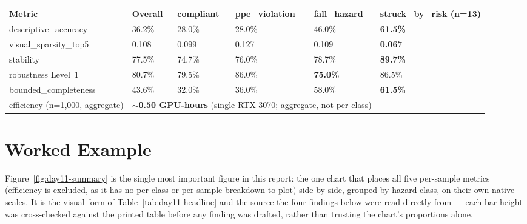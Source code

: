 \begin{center}
\begin{tabular}{p{3.6cm}p{1.5cm}p{1.6cm}p{1.7cm}p{1.6cm}p{1.8cm}}
\toprule
\textbf{Metric} & \textbf{Overall} & \textbf{compliant} & \textbf{ppe\_\allowbreak violation} & \textbf{fall\_\allowbreak hazard} & \textbf{struck\_\allowbreak by\_\allowbreak risk (n=13)} \\
\midrule
descriptive\_accuracy & 36.2\% & 28.0\% & 28.0\% & 46.0\% & \textbf{61.5\%} \\
visual\_sparsity\_top5 & 0.108 & 0.099 & 0.127 & 0.109 & \textbf{0.067} \\
stability & 77.5\% & 74.7\% & 76.0\% & 78.7\% & \textbf{89.7\%} \\
robustness Level~1 & 80.7\% & 79.5\% & 86.0\% & \textbf{75.0\%} & 86.5\% \\
bounded\_completeness & 43.6\% & 32.0\% & 36.0\% & 58.0\% & \textbf{61.5\%} \\
efficiency (n=1{,}000, aggregate) & \multicolumn{4}{l}{\textbf{$\sim$0.50 GPU-hours} (single RTX 3070; aggregate, not per-class)} \\
\bottomrule
\end{tabular}
\label{tab:day11-headline}
\end{center}

\section{Worked Example}

Figure~\ref{fig:day11-summary} is the single most important figure in this report: the one
chart that places all five per-sample metrics (efficiency is excluded, as it has no per-class
or per-sample breakdown to plot) side by side, grouped by hazard class, on their own native
scales. It is the visual form of Table~\ref{tab:day11-headline} and the source the four
findings below were read directly from --- each bar height was cross-checked against the
printed table before any finding was drafted, rather than trusting the chart's proportions
alone.

